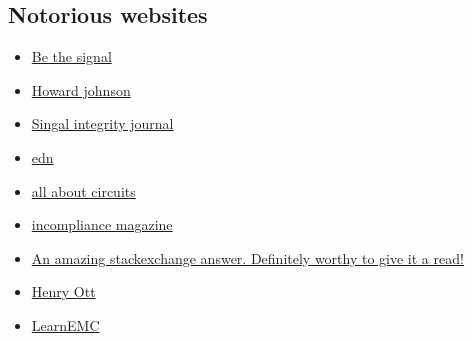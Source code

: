 \documentclass[final]{cubedoc}
\begin{document}
	\subsection{Notorious websites}
	\begin{itemize}
		\item \href{https://bethesignal.com/bogatin/}{Be the signal}
		\item \href{http://www.sigcon.com/}{Howard johnson}
		\item \href{https://www.signalintegrityjournal.com/}{Singal integrity journal}
		\item \href{https://www.edn.com/}{edn}
		\item \href{https://www.allaboutcircuits.com/}{all about circuits}
		\item \href{https://incompliancemag.com/topics/resources/}{incompliance magazine}
		\item \href{https://electronics.stackexchange.com/questions/15135/decoupling-caps-pcb-layout/15143#15143}{An amazing stackexchange answer. Definitely worthy to give it a read!}
		\item \href{http://www.hottconsultants.com/}{Henry Ott}
		\item \href{https://learnemc.com/}{LearnEMC}
	\end{itemize}
	
	
	
	
	
	
\end{document}
